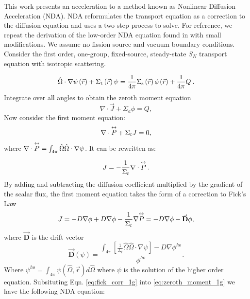 This work presents an acceleration to a method known as Nonlinear Diffusion Acceleration (NDA). NDA reformulates the transport equation as a correction to the diffusion equation and uses a two step process to solve. For reference, we repeat the derivation of the low-order NDA equation found in \cite{morel-holo} with small modifications. We assume no fission source and vacuum boundary conditions. Consider the first order, one-group, fixed-source, steady-state $S_N$ transport equation with isotropic scattering. 

  \begin{equation}
  \hat{\Omega}\cdot \nabla \psi \left(\vec{r}\right)+ \Sigma_{\mathrm{t}}\left(\vec{r}\right)\psi = \frac{1}{4 \pi} \Sigma_{\mathrm{s}}\left(\vec{r}\right) \phi\left(\vec{r}\right) + \frac{1}{4 \pi} Q\:.
  \end{equation}
Integrate over all angles to obtain the zeroth moment equation
\begin{equation}

  \nabla \cdot \vec{J} + \Sigma_a\phi  =  Q,
  \label{eq:zeroth_moment_1g}
  \end{equation}
  Now consider the first moment equation:
  \begin{equation}
  \nabla \cdot \overset{\text{\scriptsize$\leftrightarrow$}}{P} + \Sigma_t J = 0,
  \end{equation}
where $\nabla \cdot \overset{\text{\scriptsize$\leftrightarrow$}}{P} =  \int_{4\pi} \hat{\Omega} \hat{\Omega} \cdot \nabla \psi$. It can be rewritten as: 

  \begin{equation}
  J= -\frac{1}{\Sigma_t} \nabla \cdot \overset{\text{\scriptsize$\leftrightarrow$}}{P}\:. 
  \end{equation}
  By adding and subtracting the diffusion coefficient multiplied by the gradient of the scalar flux, the first moment equation takes the form of a correction to Fick's Law
  \begin{equation}
  J = -D \nabla \phi + D \nabla \phi - \frac{1}{\Sigma_t} \nabla \overset{\text{\scriptsize$\leftrightarrow$}}{P} \\

  = -D \nabla \phi - \vec{\textbf{D}} \phi,

  \label{eq:fick_corr_1g}
  \end{equation}
  where $\vec{\textbf{D}}$ is the drift vector
 \begin{equation}
  \vec{\textbf{D}} (\psi) = \frac{\int_{4\pi} [\frac{1}{\Sigma_t} \hat{\Omega} \hat{\Omega}\cdot \nabla \psi] - D \nabla \phi^{ho}}{\phi^{ho}}.
  \label{eq:drift_vector}
  \end{equation} 
Where $\psi^{ho} = \int_{4\pi} \psi(\hat{\Omega}, \vec{r}) d\hat{\Omega}$ where $\psi$ is the solution of the higher order equation. Subsituting Eqn. \eqref{eq:fick_corr_1g} into \eqref{eq:zeroth_moment_1g} we have the following NDA equation:

